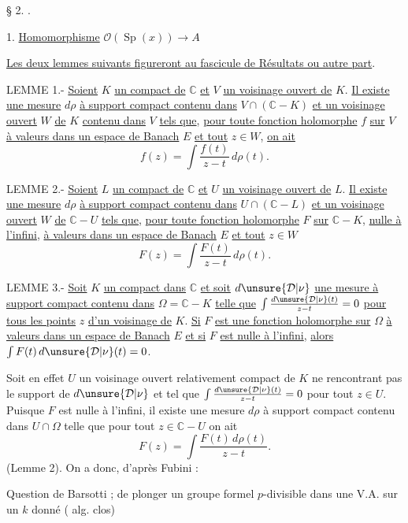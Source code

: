 § 2. .

1. \uline{Homomorphisme} $\mathcal O(\operatorname{Sp}(x))\longrightarrow A$

\uline{Les deux lemmes suivants figureront au fascicule de Résultats ou autre part}.

LEMME 1.- \uline{Soient} $K$ \uline{un compact de} $\mathbb C$ \uline{et} $V$ \uline{un voisinage ouvert de} $K$. \uline{Il existe une mesure} $d\rho$ \uline{à support compact contenu dans} $V\cap(\mathbb C-K)$ \uline{et un voisinage ouvert} $W$ \uline{de} $K$ \uline{contenu dans} $V$ \uline{tels que}, \uline{pour toute fonction holomorphe} $f$ \uline{sur} $V$ \uline{à valeurs dans un espace de Banach} $E$ \uline{et tout} $z\in W$, \uline{on ait}
\[
f(z)=\int\frac{f(t)}{z-t}\,d\rho(t).
\]

LEMME 2.- \uline{Soient} $L$ \uline{un compact de} $\mathbb C$ \uline{et} $U$ \uline{un voisinage ouvert de} $L$. \uline{Il existe une mesure} $d\rho$ \uline{à support compact contenu dans} $U\cap(\mathbb C-L)$ \uline{et un voisinage ouvert} $W$ \uline{de} $\mathbb C-U$ \uline{tels que}, \uline{pour toute fonction holomorphe} $F$ \uline{sur} $\mathbb C-K$, \uline{nulle à l'infini}, \uline{à valeurs dans un espace de Banach} $E$ \uline{et tout} $z\in W$
\[
F(z)=\int\frac{F(t)}{z-t}\,d\rho(t).
\]

LEMME 3.- \uline{Soit} $K$ \uline{un compact dans} $\mathbb C$ \uline{et soit} $d\unsure{\mathcal D|\nu}$ \uline{une mesure à support compact contenu dans} $\Omega=\mathbb C-K$ \uline{telle que} $\int\frac{d\unsure{\mathcal D|\nu}(t)}{z-t}=0$ \uline{pour tous les points} $z$ \uline{d'un voisinage de} $K$. \uline{Si} $F$ \uline{est une fonction holomorphe sur} $\Omega$ \uline{à valeurs dans un espace de Banach} $E$ \uline{et si} $F$ \uline{est nulle à l'infini}, \uline{alors} $\int F(t)\,d\unsure{\mathcal D|\nu}(t)=0$.

Soit en effet $U$ un voisinage ouvert relativement compact de $K$ ne rencontrant pas le support de $d\unsure{\mathcal D|\nu}$ et tel que $\int\frac{d\unsure{\mathcal D|\nu}(t)}{z-t}=0$ pour tout $z\in U$. Puisque $F$ est nulle à l'infini, il existe une mesure $d\rho$ à support compact contenu dans $U\cap\Omega$ telle que pour tout $z\in\mathbb C-U$ on ait
\[
F(z)=\int\frac{F(t)\,d\rho(t)}{z-t}.
\]
(Lemme 2). On a donc, d'après Fubini :



Question  de Barsotti ;   de plonger un groupe formel $p$-divisible dans une V.A. sur un $k$ donné ( alg. clos)

